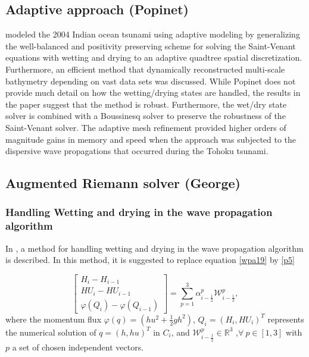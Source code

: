 \documentclass[9pt,a4paper]{article}
\begin{document}
	\subsection{Adaptive approach (Popinet)}
	\citet{popinet2011quadtree} modeled the 2004 Indian ocean tsunami using adaptive modeling by generalizing the   \citet{audusse2004fast} well-balanced and positivity preserving scheme for solving the Saint-Venant equations with wetting and drying to an adaptive quadtree spatial discretization.  Furthermore, an efficient method that dynamically reconstructed multi-scale bathymetry depending on vast data sets was discussed.  While Popinet does not provide much detail on how the wetting/drying states are handled, the results in the paper suggest that the method is robust.  Furthermore, the wet/dry state solver is combined with a Boussinesq solver to preserve the robustness of the Saint-Venant solver. The adaptive mesh refinement provided higher orders of magnitude gains in memory and speed when the approach was subjected to the dispersive wave propagations that occurred during the Tohoku tsunami.
	
	
	\subsection{Augmented Riemann solver (George)}
	
	\subsubsection{Handling Wetting and drying in the wave propagation algorithm}
	
	
	In  \citet{ge:2008,ge:2011}, a method for handling wetting and drying in the wave propagation algorithm is described.  In this method, it is suggested to replace  equation	\eqref{wpa19} by  \eqref{p5}
	
	
	\begin{equation}
		\begin{bmatrix} 
			H_{i} - H_{i-1}\\ 	HU_{i} - HU_{i-1} \\  \varphi(Q_{i}) - \varphi(Q_{i-1}) 
		\end{bmatrix} = \sum_{p=1}^{3} \alpha_{i-\frac{1}{2}}^{p} \mathcal{W}_{i-\frac{1}{2}}^{p},
		\label{p5}
	\end{equation}
	where the momentum flux $\varphi(q) = (hu^{2} + \frac{1}{2} gh^{2})$, $Q_{i} = (H_{i},HU_{i})^{T}$ represents the numerical solution of $q = (h,hu)^{T}$ in $C_{i}$, and $\mathcal{W}_{i-\frac{1}{2}}^{p} \in \mathbb{R}^{3}$ ,$\forall ~ p \in [1,3] $ with $p$ a set of chosen independent vectors. 
	
\end{document}
